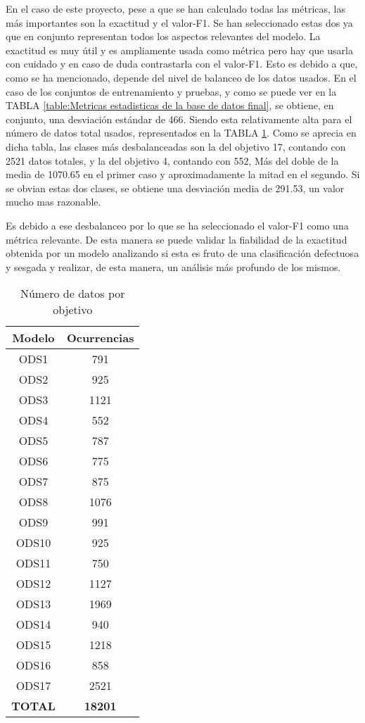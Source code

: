 En el caso de este proyecto, pese a que se han calculado todas las métricas, las
más importantes son la exactitud y el valor-F1. Se han seleccionado estas dos ya
que en conjunto representan todos los aspectos relevantes del modelo. La
exactitud es muy útil y es ampliamente usada como métrica pero hay que usarla
con cuidado y en caso de duda contrastarla con el valor-F1. Esto es debido a
que, como se ha mencionado, depende del nivel de balanceo de los datos usados.
En el caso de los conjuntos de entrenamiento y pruebas, y como se puede ver en
la TABLA \ref{table:Metricas estadisticas de la base de datos final}, se
obtiene, en conjunto, una desviación estándar de 466. Siendo esta relativamente
alta para el número de datos total usados, representados en la TABLA
\ref{table:Numero de datos por objetivo}. Como se aprecia en dicha tabla, las
clases más desbalanceadas son la del objetivo 17, contando con 2521 datos
totales, y la del objetivo 4, contando con 552, Más del doble de la media de
1070.65 en el primer caso y aproximadamente la mitad en el segundo. Si se
obvian estas dos clases, se obtiene una desviación media de 291.53, un valor
mucho mas razonable.

Es debido a ese desbalanceo por lo que se ha seleccionado el valor-F1 como una
métrica relevante. De esta manera se puede validar la fiabilidad de la exactitud
obtenida por un modelo analizando si esta es fruto de una clasificación
defectuosa y sesgada y realizar, de esta manera, un análisis más profundo de los
mismos. 

\begin{table}[H]
    \begin{tabular}{| c | c |}
        \hline
        Modelo & Ocurrencias\\
        \hline \hline
        ODS1  & 791\\ \hline
        ODS2  & 925\\ \hline
        ODS3  & 1121\\ \hline
        ODS4  & 552\\ \hline
        ODS5  & 787\\ \hline
        ODS6  & 775\\ \hline
        ODS7  & 875\\ \hline
        ODS8  & 1076\\ \hline
        ODS9  & 991\\ \hline
        ODS10 & 925\\ \hline
        ODS11 & 750\\ \hline
        ODS12 & 1127\\ \hline
        ODS13 & 1969\\ \hline
        ODS14 & 940\\ \hline
        ODS15 & 1218\\ \hline
        ODS16 & 858\\ \hline
        ODS17 & 2521\\ \hline
        \textbf{TOTAL} & \textbf{18201}\\ \hline
    \end{tabular}
    \caption{Número de datos por objetivo}
    \label{table:Numero de datos por objetivo}
\end{table}


